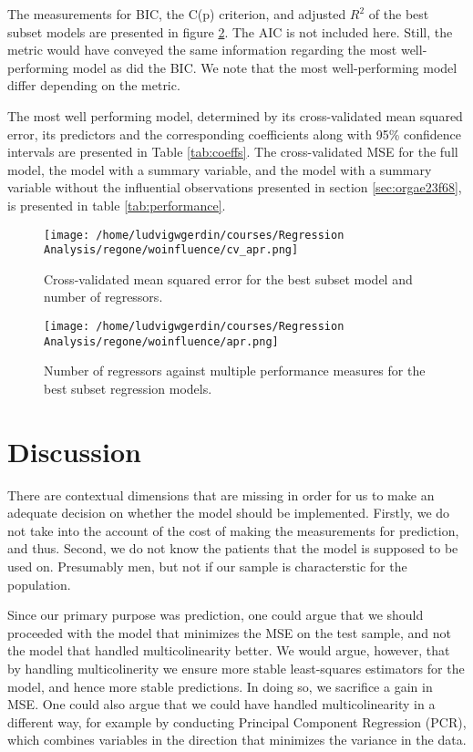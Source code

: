 \documentclass[11pt]{article}
\begin{document}
The measurements for BIC, the C(p) criterion, and adjusted \(R^2\) of the best subset models are presented
in figure \ref{fig:orgeaf1a25}. The AIC is not included here. Still, the metric would have conveyed 
the same information regarding the most well-performing model as did the BIC. We note that 
the most well-performing model differ depending on the metric.

The most well performing model, determined by its cross-validated mean squared error, its predictors and
the corresponding coefficients along with 95\% confidence intervals are presented in Table \ref{tab:coeffs}.
The cross-validated MSE for the full model, the model with a summary variable, and the model with a
summary variable without the influential observations presented in section \ref{sec:orgae23f68}, 
is presented in table \ref{tab:performance}.





\begin{figure}[htbp]
\centering
\texttt{[image: /home/ludvigwgerdin/courses/Regression Analysis/regone/woinfluence/cv\_apr.png]}
\caption{\label{fig:org8f6f5df}
Cross-validated mean squared error for the best subset model and number of regressors.}
\end{figure}

\begin{figure}[htbp]
\centering
\texttt{[image: /home/ludvigwgerdin/courses/Regression Analysis/regone/woinfluence/apr.png]}
\caption{\label{fig:orgeaf1a25}
Number of regressors against multiple performance measures for the best subset regression models.}
\end{figure}

\newpage
\section{Discussion}
\label{sec:org54d6d7b}

There are contextual dimensions that are missing in order for us to make an adequate decision on whether 
the model should be implemented. Firstly, we do not take into the account of the cost of making the 
measurements for prediction, and thus. Second, we do not know the patients that the model is supposed 
to be used on. Presumably men, but not if our sample is characterstic for the population.

Since our primary purpose was prediction, one could argue that we should proceeded with the model that minimizes the
MSE on the test sample, and not the model that handled multicolinearity better.  
We would argue, however, that by handling multicolinerity we ensure more stable least-squares estimators for 
the model, and hence more stable predictions. In doing so, we sacrifice a gain in MSE.
One could also argue that we could have handled multicolinearity in a different way, for example by conducting
Principal Component Regression (PCR), which combines variables in the direction that minimizes the variance
in the data.
\end{document}
